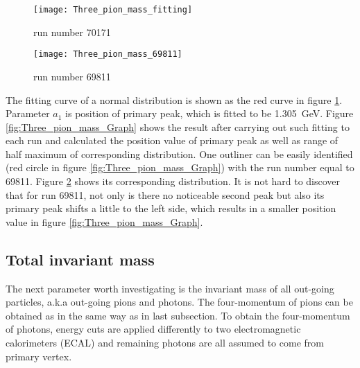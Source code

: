 \begin{figure*}[t!]
	\centering
	\begin{subfigure}{0.48\textwidth}
		\texttt{[image: Three\_pion\_mass\_fitting]}
		\caption{run number 70171}
		\label{fig:Three_pion_mass_fitting}
	\end{subfigure}
	\begin{subfigure}{0.48\textwidth}
		\texttt{[image: Three\_pion\_mass\_69811]}
		\caption{run number 69811}
		\label{fig:Three_pion_mass_69811}
	\end{subfigure}
	\caption{Invariant mass distribution of three pions and their corresponding fitting result. The range of fitting corresponds to \SI{30}{\percent} of maximal value of distribution. (a) Distribution of a normal run. The first peak (primary) locates at around \SI{1.3}{\giga\electronvolt}. The fitting curve (red) coincide well with data around primary peak, but poorly around second peak. (b) Distribution of an abnormal run. No second peak can be found on the right side of primary peak. Parameter $a_1$ is fitted to be \SI{1.034}{\giga\electronvolt}, which is slightly larger than correct value due to the bad fitting coincidence. }
	\label{fig:pion_mass}
\end{figure*}



The fitting curve of a normal distribution is shown as the red curve in figure \ref{fig:Three_pion_mass_fitting}. Parameter $a_1$ is position of primary peak, which is fitted to be \SI{1.305}{\giga\electronvolt}. Figure \ref{fig:Three_pion_mass_Graph} shows the result after carrying out such fitting to each run and calculated the position value of primary peak as well as range of half maximum of corresponding distribution. One outliner can be easily identified (red circle in figure \ref{fig:Three_pion_mass_Graph}) with the run number equal to 69811. Figure \ref{fig:Three_pion_mass_69811} shows its corresponding distribution. It is not hard to discover that for run 69811, not only is there no noticeable second peak but also its primary peak shifts a little to the left side, which results in a smaller position value in figure \ref{fig:Three_pion_mass_Graph}.
\subsection{Total invariant mass}
The next parameter worth investigating is the invariant mass of all out-going particles, a.k.a out-going pions and photons. The four-momentum of pions can be obtained as in the same way as in last subsection. To obtain the four-momentum of photons, energy cuts are applied differently to two electromagnetic calorimeters (ECAL) and remaining photons are all assumed to come from primary vertex.
